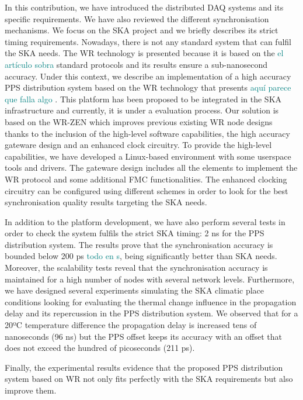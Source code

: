 In this contribution, we have introduced the distributed DAQ systems and its 
specific requirements. We have also reviewed the different synchronisation 
mechanisms. We focus on the SKA project and we briefly describes its strict 
timing requirements. Nowadays, there is not any standard system that can fulfil 
the SKA needs. The WR technology is presented because it is based on the 
\textcolor{teal}{el artículo sobra} standard protocols and its results ensure a 
sub-nanosecond accuracy. Under this context, we describe an implementation of a 
high accuracy PPS distribution system based on the WR technology that presents 
\textcolor{teal}{aquí parece que falla algo}
. This platform has been proposed to be integrated in the SKA infrastructure 
and currently, it is under a evaluation process. 
Our solution is based on the WR-ZEN which improves previous existing WR node designs 
thanks to the inclusion of the high-level software capabilities, the high accuracy gateware
design and an enhanced clock circuitry.
To provide the high-level capabilities, we have developed a Linux-based environment with some
userspace tools and drivers. The gateware design includes all the elements to implement the 
WR protocol and some additional FMC functionalities. The enhanced clocking circuitry can be configured using different schemes in order to look for the best synchronisation quality results targeting the SKA needs. 

In addition to the platform development, we have also perform several tests in 
order to check the system fulfils the strict SKA timing: 2 ns for the PPS 
distribution system. The results prove that the synchronisation accuracy is 
bounded below 200 ps \textcolor{teal}{todo en s}, being significantly better 
than SKA needs. Moreover, the scalability tests reveal that the synchronisation 
accuracy is maintained for a high number of nodes with several network levels. 
Furthermore, we have 
designed several experiments simulating the SKA climatic place conditions 
looking for evaluating the thermal change influence in the propagation delay 
and its repercussion in the PPS distribution system. We observed that for a 
20ºC temperature difference the propagation delay is increased tens of 
nanoseconds (96 ns) but the PPS offset keeps its accuracy with an offset that 
does not exceed the hundred of picoseconds (211 ps). 

Finally, the experimental results evidence that the proposed PPS distribution system based on WR not only fits perfectly with the SKA requirements but also improve them.


